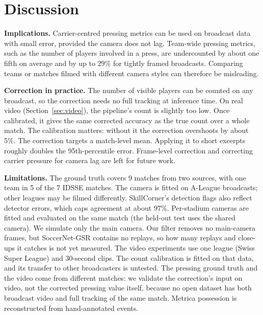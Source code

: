\documentclass[runningheads]{llncs}
\begin{document}
\section{Discussion}

\textbf{Implications.} Carrier-centred pressing metrics can be used on broadcast data with small error, provided the
camera does not lag. Team-wide pressing metrics, such as the number of players involved in a press, are undercounted by
about one fifth on average and by up to 29\% for tightly framed broadcasts. Comparing teams or matches filmed with
different camera styles can therefore be misleading.

\textbf{Correction in practice.} The number of visible players can be counted on any broadcast, so the correction
needs no full tracking at inference time. On real video (Section~\ref{sec:video}), the pipeline's count is slightly
too low. Once calibrated, it gives the same corrected accuracy as the true count over a whole match. The calibration
matters: without it the correction overshoots by about 5\%. The correction targets a match-level mean. Applying it to
short excerpts roughly doubles the 95th-percentile error. Frame-level correction and correcting carrier pressure for
camera lag are left for future work.

\textbf{Limitations.} The ground truth covers 9 matches from two sources, with one team in 5 of the 7 IDSSE matches.
The camera is fitted on A-League broadcasts; other leagues may be filmed differently. SkillCorner's detection flags
also reflect detector errors, which caps agreement at about 97\%. Per-stadium cameras are fitted and evaluated on the
same match (the held-out test uses the shared camera). We simulate only the main camera. Our filter removes no
main-camera frames, but SoccerNet-GSR contains no replays, so how many replays and close-ups it catches is not yet
measured. The video experiments use one league (Swiss Super League) and 30-second clips. The count calibration is
fitted on that data, and its transfer to other broadcasters is untested. The pressing ground truth and the video
come from different matches: we validate the correction's input on video, not the corrected pressing value itself,
because no open dataset has both broadcast video and full tracking of the same match. Metrica possession is
reconstructed from hand-annotated events.

\end{document}
